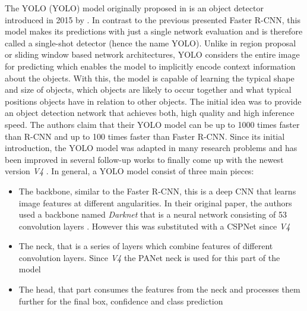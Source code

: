 The \acl{YOLO} (\ac{YOLO}) model originally proposed in \autocite{yoloOriginal} is an object detector introduced in 2015 by \citeauthor{yoloOriginal}. In contrast to the previous presented Faster \ac{R-CNN}, this model makes its predictions with just a single network evaluation and is therefore called a single-shot detector (hence the name \ac{YOLO}). Unlike in region proposal or sliding window based network architectures, \ac{YOLO} considers the entire image
for predicting which enables the model to implicitly encode context information about the objects. With this, the model is capable of learning the typical shape and size of objects, which objects are likely to occur together and what typical positions objects have in relation to other objects. The initial idea was to provide an object detection network that achieves both, high quality and high inference speed. The authors claim that their \ac{YOLO} model can be up to 1000 times faster than \ac{R-CNN} and up to 100 times faster than Faster \ac{R-CNN}.
Since its initial introduction, the \ac{YOLO} model was adapted in many research problems and has been improved in several follow-up works \autocite{yolov2} \autocite{yolov3} to finally come up with the newest version \textit{V4} \autocite{yolov4}.
In general, a \ac{YOLO} model consist of three main pieces:
\begin{itemize}
	\item The backbone, similar to the Faster \ac{R-CNN}, this is a deep \ac{CNN} that learns image features at different angularities. In their original paper, the authors used a backbone named \textit{Darknet} that is a neural network consisting of 53 convolution
	layers \autocite{yolov3}. However this was substituted with a CSPNet \autocite{wang2020cspnet} since \textit{V4} \autocite{yolov4}
	\item The neck, that is a series of layers which combine features of different convolution layers. Since \textit{V4} the PANet \autocite{tan2020efficientdet} neck is used for this part of the model 
	\item The head, that part consumes the features from the neck and processes them further for the final box, confidence and class prediction
\end{itemize}
